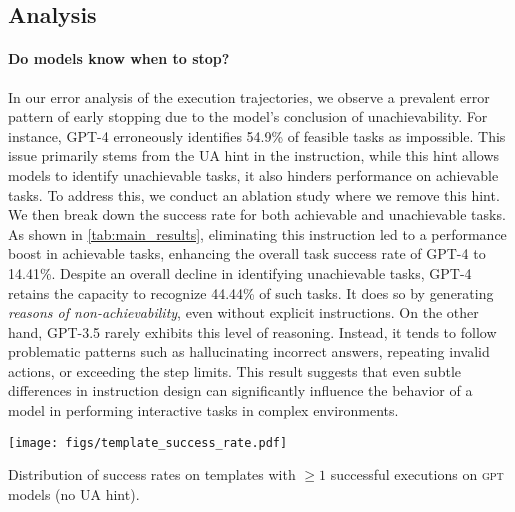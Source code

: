 \subsection{Analysis}\label{sec:analysis}
\paragraph{Do models know when to stop?}  
In our error analysis of the execution trajectories, we observe a prevalent error pattern of early stopping due to the model's conclusion of unachievability. 
For instance, \textsc{GPT-4} erroneously identifies 54.9\% of feasible tasks as impossible. 
This issue primarily stems from the UA hint in the instruction, while this hint allows models to identify unachievable tasks, it also hinders performance on achievable tasks.
To address this, we conduct an ablation study where we remove this hint. We then break down the success rate for both achievable and unachievable tasks.
As shown in \autoref{tab:main_results}, eliminating this instruction led to a performance boost in achievable tasks, enhancing the overall task success rate of \textsc{GPT-4} to 14.41\%.
Despite an overall decline in identifying unachievable tasks, \textsc{GPT-4} retains the capacity to recognize 44.44\% of such tasks.
It does so by generating \emph{reasons of non-achievability}, even without explicit instructions.
On the other hand, \textsc{GPT-3.5} rarely exhibits this level of reasoning. 
Instead, it tends to follow problematic patterns such as hallucinating incorrect answers, repeating invalid actions, or exceeding the step limits.
This result suggests that even subtle differences in instruction design can significantly influence the behavior of a model in performing interactive tasks in complex environments.

\begin{wraptable}[11]{r}{0.29\linewidth}
    \vspace{-30pt}
 \texttt{[image: figs/template\_success\_rate.pdf]}
    \vspace{-20pt}
    \caption{Distribution of success rates on templates with $ \geq 1$ successful executions on \textsc{gpt} models (no UA hint).}\label{fig:success_template}
\end{wraptable}

